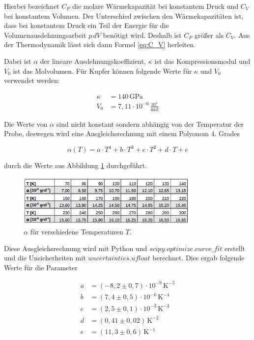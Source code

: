 Hierbei bezeichnet $C_P$ die molare Wärmekapazität bei konstantem Druck und $C_V$ bei konstantem Volumen. Der Unterschied zwischen den Wärmekapazitäten ist, dass bei konstantem Druck ein Teil der Energie für die Volumenausdehnungsarbeit $p \, dV$ benötigt wird. Deshalb ist $C_P$ größer als $C_V$. Aus der Thermodynamik lässt sich dann Formel \eqref{eq:C_V} herleiten. 

Dabei ist $\alpha$ der lineare Ausdehnungskoeffizient, $\kappa$ \cite{kappa} ist das Kompressionsmodul und $V_0$ \cite{V0} ist das Molvolumen. Für Kupfer können folgende Werte für $\kappa$ und $V_0$ verwendet werden:

\begin{align*}
    \kappa &= 140 \, \mathrm{GPa} \\
    V_0 &= 7, \! 11 \cdot 10^{-6} \, \frac{\mathrm{m}^3}{\mathrm{mol}}
\end{align*}

Die Werte von $\alpha$ sind nicht konstant sondern abhängig von der Temperatur der Probe, deswegen wird eine Ausgleichsrechnung mit einem Polyonom 4. Grades

\begin{equation}
    \alpha (T) = a \cdot T^4 + b \cdot T^3 + c \cdot T^2 + d \cdot T + e
    \label{eq:alpha}
\end{equation}

durch die Werte aus Abbildung \ref{fig:alpha} durchgeführt.

\begin{figure}
    \centering
    \includegraphics[width=0.8\textwidth]{build/alpha.PNG}
    \caption{$\alpha$ für verschiedene Temperaturen $T$. \cite{Anleitung}}
    \label{fig:alpha}
\end{figure}

Diese Ausgleichsrechnung wird mit Python und $scipy.optimize.curve\_fit$ erstellt und die Unsicherheiten mit $uncertainties.ufloat$ berechnet. Dies ergab folgende Werte für die Parameter

\begin{align*}
    a &= (-8, \! 2 \pm 0, \! 7) \cdot 10^{-9} \, \mathrm{K}^{-5} \\
    b &= (7, \! 4 \pm 0, \! 5) \cdot 10^{-6} \, \mathrm{K}^{-4} \\
    c &= (2, \! 5 \pm 0, \! 1) \cdot 10^{-3} \, \mathrm{K}^{-3} \\
    d &= (0, \! 41 \pm 0, \! 02) \, \mathrm{K}^{-2} \\
    e &= (11, \! 3 \pm 0, \! 6) \, \mathrm{K}^{-1}
\end{align*}

